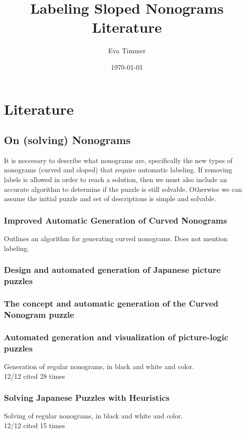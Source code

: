 \documentclass[a4paper]{article}
\title{Labeling Sloped Nonograms Literature}
\author{Eva Timmer}
\date{\today}
\begin{document}
\maketitle

\section{Literature}
\subsection{On (solving) Nonograms}
It is neccesary to describe what nonograms are, specifically the new types of nonograms (curved and sloped) that require automatic labeling. If removing labels is allowed in order to reach a solution, then we must also include an accurate algorithm to determine if the puzzle is still solvable. Otherwise we can assume the initial puzzle and set of descriptions is simple and solvable.\\
\subsubsection{Improved Automatic Generation of Curved Nonograms \cite{van2017improved}}
Outlines an algorithm for generating curved nonograms. Does not mention labeling.

\subsubsection{Design and automated generation of Japanese picture puzzles \cite{van2019design}}

\subsubsection{The concept and automatic generation of the Curved Nonogram puzzle \cite{de2016concept}}

\subsubsection{Automated generation and visualization of picture-logic puzzles \cite{ortiz2007automated}}
Generation of regular nonograms, in black and white and color. \\
12/12 cited 28 times

\subsubsection{Solving Japanese Puzzles with Heuristics \cite{salcedo2007solving}}
Solving of regular nonograms, in black and white and color.\\
12/12 cited 15 times
\end{document}
